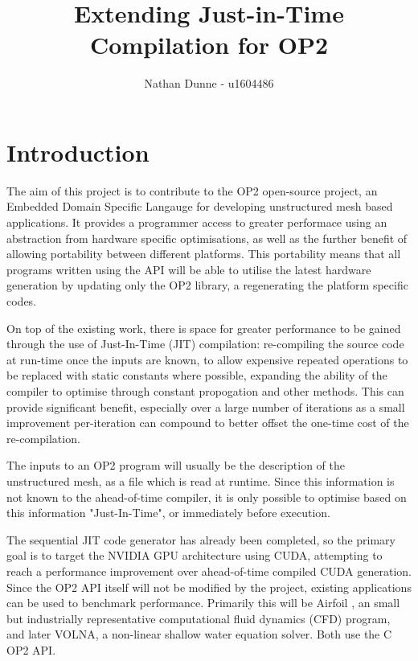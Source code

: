 \documentclass[11pt]{article}
\title{Extending Just-in-Time Compilation for OP2}
\author{Nathan Dunne - u1604486}
\begin{document}
\maketitle

\section*{Introduction}
The aim of this project is to contribute to the OP2 open-source project\cite{OP2rep}, an Embedded Domain Specific Langauge for developing unstructured mesh based applications. It provides a programmer access to greater performace using an abstraction from hardware specific optimisations, as well as the further benefit of allowing portability between different platforms. This portability means that all programs written using the API will be able to utilise the latest hardware generation by updating only the OP2 library, a regenerating the platform specific codes.
\par On top of the existing work, there is space for greater performance to be gained through the use of Just-In-Time (JIT) compilation: re-compiling the source code at run-time once the inputs are known, to allow expensive repeated operations to be replaced with static constants where possible, expanding the ability of the compiler to optimise through constant propogation and other methods. This can provide significant benefit, especially over a large number of iterations as a small improvement per-iteration can compound to better offset the one-time cost of the re-compilation. 
\par The inputs to an OP2 program will usually be the description of the unstructured mesh, as a file which is read at runtime. Since this information is not known to the ahead-of-time compiler, it is only possible to optimise based on this information "Just-In-Time", or immediately before execution.
\par The sequential JIT code generator has already been completed, so the primary goal is to target the NVIDIA GPU architecture using CUDA, attempting to reach a performance improvement over ahead-of-time compiled CUDA generation. Since the OP2 API itself will not be modified by the project, existing applications can be used to benchmark performance. Primarily this will be Airfoil \cite{airfoil}, an small but industrially representative computational fluid dynamics (CFD) program, and later VOLNA\cite{volna}, a non-linear shallow water equation solver. Both use the C OP2 API.
\end{document}
